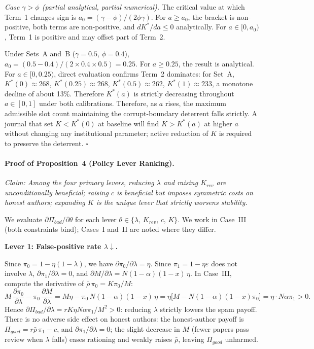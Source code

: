 \documentclass{article}
\begin{document}
\medskip
\noindent\textit{Case $\gamma > \phi$ (partial analytical, partial numerical).}
The critical value at which Term~1 changes sign is $a_0 = (\gamma-\phi)/(2\phi\gamma)$.
For $a \geq a_0$, the bracket is non-positive, both terms are non-positive, and $dK^*/da \leq 0$ analytically.
For $a \in [0, a_0)$, Term~1 is positive and may offset part of Term~2.

Under Sets~A and~B ($\gamma=0.5$, $\phi=0.4$), $a_0 = (0.5-0.4)/(2\times0.4\times0.5) = 0.25$.
For $a \geq 0.25$, the result is analytical.
For $a \in [0,0.25)$, direct evaluation confirms Term~2 dominates:
for Set~A, $K^*(0)\approx 268$, $K^*(0.25)\approx 268$, $K^*(0.5)\approx 262$, $K^*(1)\approx 233$,
a monotone decline of about 13\%.
Therefore $K^*(a)$ is strictly decreasing throughout $a\in[0,1]$ under both calibrations.
Therefore, as $a$ rises, the maximum admissible slot count maintaining the corrupt-boundary deterrent falls strictly.
A journal that set $K < K^*(0)$ at baseline will find $K > K^*(a)$ at higher $a$ without changing any institutional parameter; active reduction of $K$ is required to preserve the deterrent.
\hfill$\square$

\bigskip

\paragraph{Proof of Proposition~4 (Policy Lever Ranking).}

\noindent\textit{Claim: Among the four primary levers, reducing $\lambda$ and raising $K_{\mathit{rev}}$ are unconditionally beneficial; raising $c$ is beneficial but imposes symmetric costs on honest authors; expanding $K$ is the unique lever that strictly worsens stability.}

\medskip
We evaluate $\partial\Pi_{\mathit{bad}}/\partial\theta$ for each lever $\theta \in \{\lambda,\,K_{\mathit{rev}},\,c,\,K\}$.
We work in Case~III (both constraints bind); Cases~I and~II are noted where they differ.

\medskip\noindent\textbf{Lever 1: False-positive rate $\lambda\downarrow$.}

Since $\pi_0 = 1-\eta(1-\lambda)$, we have $\partial\pi_0/\partial\lambda = \eta$.
Since $\pi_1 = 1-\eta\varepsilon$ does not involve $\lambda$, $\partial\pi_1/\partial\lambda = 0$, and $\partial M/\partial\lambda = N(1-\alpha)(1-x)\,\eta$.
In Case~III, compute the derivative of $\bar\rho\,\pi_0 = K\pi_0/M$:
\[
  M\,\frac{\partial\pi_0}{\partial\lambda} - \pi_0\,\frac{\partial M}{\partial\lambda}
  = M\eta - \pi_0\,N(1-\alpha)(1-x)\,\eta
  = \eta\bigl[M - N(1-\alpha)(1-x)\pi_0\bigr]
  = \eta\cdot N\alpha\pi_1 > 0.
\]
Hence $\partial\Pi_{\mathit{bad}}/\partial\lambda = rK\eta N\alpha\pi_1/M^2 > 0$: reducing $\lambda$ strictly lowers the spam payoff.
There is no adverse side effect on honest authors: the honest-author payoff is $\Pi_{\mathit{good}} = r\bar\rho\,\pi_1 - c$, and $\partial\pi_1/\partial\lambda = 0$; the slight decrease in $M$ (fewer papers pass review when $\lambda$ falls) eases rationing and weakly raises $\bar\rho$, leaving $\Pi_{\mathit{good}}$ unharmed.
\end{document}
